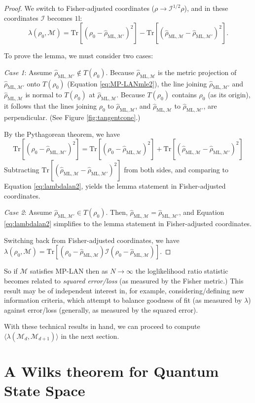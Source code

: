 \documentclass[aps,pra, twocolumn]{revtex4-1}
\newcommand{\M}{\mathcal{M}}
\newcommand{\Id}{\mathbb{I}}
\def\Id{1\!\mathrm{l}}
\newcommand{\rhohat}{\hat{\rho}}
\newcommand{\rhoML}[1]{\rhohat_{\scriptscriptstyle{\mathrm{ML},#1}}}
\begin{document}
\begin{proof}
We switch to Fisher-adjusted coordinates ($\rho \rightarrow \mathcal{I}^{1/2}\rho$), and in these coordinates $\mathcal{I}$ becomes $\Id$:
\begin{equation}
\label{eq:lambdalan2}
\lambda(\rho_{0}, \M) = \mathrm{Tr}[(\rho_{0} - \rhoML{\M'})^{2}]-  \mathrm{Tr}[(\rhoML{\M} - \rhoML{\M'})^{2}].
\end{equation}

To prove the lemma, we must consider two cases:

\emph{Case 1}: Assume $\rhoML{\M'} \not \in T(\rho_{0})$. Because $\rhoML{\M}$ is the metric projection of $\rhoML{\M'}$ onto $T(\rho_{0})$ (Equation \eqref{eq:MP-LANmle2}),  the line joining $\rhoML{\M'}$ and $\rhoML{\M}$ is normal to $T(\rho_{0})$ at $\rhoML{\M}$. Because $T(\rho_{0})$ contains $\rho_{0}$ (as its origin), it follows that the lines joining $\rho_{0}$ to $\rhoML{\M}$, and $\rhoML{\M}$ to $\rhoML{\M'}$, are perpendicular. (See Figure \ref{fig:tangentcone}.)

 By the Pythagorean theorem, we have
\[\mathrm{Tr}[(\rho_{0} -\rhoML{\M'})^{2}] =  \mathrm{Tr}[(\rho_{0} - \rhoML{\M})^{2}] + \mathrm{Tr}[(\rhoML{\M} - \rhoML{\M'})^{2}]\]
Subtracting $\mathrm{Tr}[(\rhoML{\M} - \rhoML{\M'})^{2}]$ from both sides, and comparing to Equation \eqref{eq:lambdalan2}, yields the lemma statement in Fisher-adjusted coordinates.

\emph{Case 2}: Assume $\rhoML{\M'} \in T(\rho_{0})$. Then, $\rhoML{\M}= \rhoML{\M'}$, and Equation \eqref{eq:lambdalan2} simplifies to the lemma statement in Fisher-adjusted coordinates.


Switching back from Fisher-adjusted coordinates, we have $\lambda(\rho_{0}, \M) = \mathrm{Tr}[(\rho_{0} - \rhoML{\M})\mathcal{I}(\rho_{0} - \rhoML{\M})]$.
\end{proof}

So if $\M$ satisfies MP-LAN then as $N\rightarrow \infty$ the loglikelihood ratio statistic becomes related to \emph{squared error/loss} (as measured by the Fisher metric.) This result may be of independent interest in, for example, considering/defining new information criteria, which attempt to balance goodness of fit (as measured by $\lambda$) against error/loss (generally, as measured by the squared error).

With these technical results in hand, we can proceed to compute $\langle \lambda(\M_{d}, \M_{d+1})\rangle$ in the next section.

\section{A Wilks theorem for Quantum State Space}
\label{sec:computingllrs}
\end{document}
